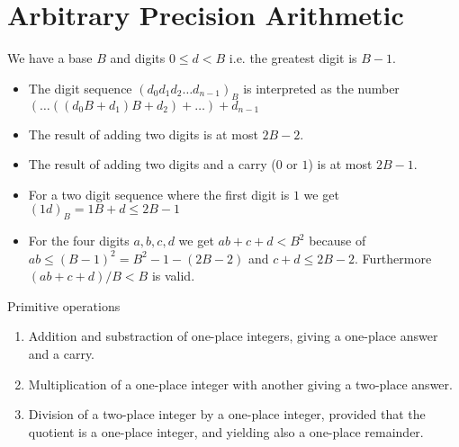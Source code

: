 \section{Arbitrary Precision Arithmetic}

We have a base $B$ and digits $0 \le d < B$ i.e. the greatest digit is $B-1$.
\begin{itemize}

\item The digit sequence $(d_0d_1d_2 \ldots d_{n-1})_B$ is interpreted as the number
  $(\ldots((d_0 B + d_1)B + d_2) + \ldots) + d_{n-1} $

\item The result of adding two digits is at most $2B-2$.

\item The result of adding two digits and a carry ($0$ or $1$) is at most
  $2B-1$.

\item For a two digit sequence where the first digit is $1$ we get
  $(1 d)_B = 1 B + d \le 2 B - 1$

\item For the four digits $a,b,c,d$ we get $a b + c + d < B^2$ because of $a b
  \le (B - 1)^2 = B^2 - 1 - (2B-2)$ and $c + d \le 2B-2$. Furthermore $(a b +
  c + d)/B < B$ is valid.
 \end{itemize}


Primitive operations
\begin{enumerate}
\item Addition and substraction of one-place integers, giving a one-place
  answer and a carry.

\item Multiplication of a one-place integer with another giving a two-place
  answer.

\item Division of a two-place integer by a one-place integer, provided that
  the quotient is a one-place integer, and yielding also a one-place
  remainder.

\end{enumerate}





